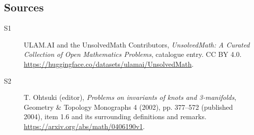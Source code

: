 \documentclass[11pt]{article}
\begin{document}
\subsection{Sources}
\begin{description}
\item[\hypertarget{source:statement:1}{S1}] ULAM.AI and the UnsolvedMath Contributors, \emph{UnsolvedMath: A Curated Collection of Open Mathematics Problems}, catalogue entry. CC BY 4.0. \url{https://huggingface.co/datasets/ulamai/UnsolvedMath}.
\item[\hypertarget{source:statement:2}{S2}] T. Ohtsuki (editor), \emph{Problems on invariants of knots and 3-manifolds}, Geometry \& Topology Monographs 4 (2002), pp. 377--572 (published 2004), item 1.6 and its surrounding definitions and remarks. \url{https://arxiv.org/abs/math/0406190v1}.
\end{description}
\label{end:statement}
\end{document}
